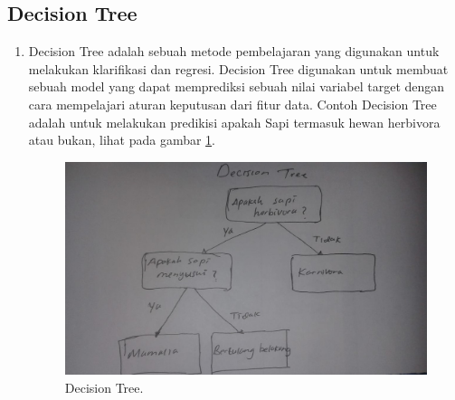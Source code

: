 \subsection{Decision Tree}
\begin{enumerate}
\item Decision Tree adalah sebuah metode pembelajaran yang digunakan untuk melakukan klarifikasi dan regresi. Decision Tree digunakan untuk membuat sebuah model yang dapat memprediksi sebuah nilai variabel target dengan cara mempelajari aturan keputusan dari fitur data. Contoh Decision Tree adalah untuk melakukan predikisi apakah Sapi termasuk hewan herbivora atau bukan, lihat pada gambar \ref{6}.

		\begin{figure}[ht]
		\centerline{\includegraphics[width=1\textwidth]{figures/AIP/6.JPEG}}
		\caption{Decision Tree.}
		\label{6}
		\end{figure}

\end{enumerate}

